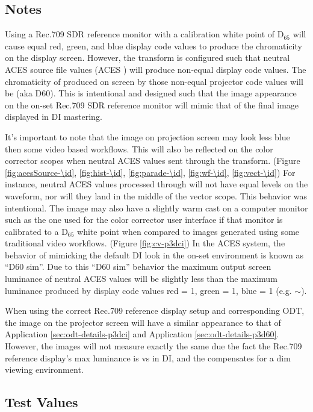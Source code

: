 \subsection{Notes}
\label{subsec:notes-\id}

Using a Rec.709 SDR reference monitor with a calibration white point of D$_{65}$ will cause equal red, green, and blue display code values to produce the chromaticity  on the display screen. However, the \transformID{} transform is configured such that neutral ACES source file values (ACES \rgbequal) will produce non-equal display code values. The chromaticity of produced on screen by those non-equal projector code values will be  (aka D60).  This is intentional and designed such that the image appearance on the on-set Rec.709 SDR reference monitor will mimic that of the final image displayed in DI mastering.

It's important to note that the image on projection screen may look less blue then some video based workflows. This will also be reflected on the color corrector scopes when neutral ACES values sent through the \transformID{} transform. (Figure \ref{fig:acesSource-\id}, \ref{fig:hist-\id}, \ref{fig:parade-\id}, \ref{fig:wf-\id}, \ref{fig:vect-\id}) For instance, neutral ACES values processed through \transformID{} will not have equal levels on the waveform, nor will they land in the middle of the vector scope. This behavior was intentional. The image may also have a slightly warm cast on a computer monitor such as the one used for the color corrector user interface if that monitor is calibrated to a D$_{65}$ white point when compared to images generated using some traditional video workflows. (Figure \ref{fig:cv-p3dci}) In the ACES system, the behavior of mimicking the default DI look in the on-set environment is known as ``D60 sim''. Due to this ``D60 sim'' behavior the maximum output screen luminance of neutral ACES values will be slightly less than the maximum luminance produced by display code values red = 1, green = 1, blue = 1 (e.g. $\mathtt{\sim}$).

When using the correct Rec.709 reference display setup and corresponding ODT, the image on the projector screen will have a similar appearance to that of Application \ref{sec:odt-details-p3dci} and Application \ref{sec:odt-details-p3d60}.  However, the images will not measure exactly the same due the fact the Rec.709 reference display's max luminance is  vs  in DI, and the \transformID{} compensates for a dim viewing environment.


\subsection{Test Values}
\label{subsec:testValues-\id}

\testValuesSubSec{}
